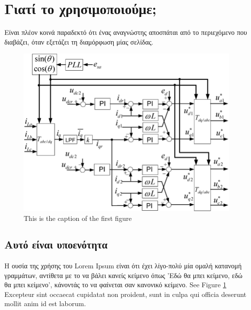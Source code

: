 
\section{Γιατί το χρησιμοποιούμε;}
    \paragraph{}
    Είναι πλέον κοινά παραδεκτό ότι ένας αναγνώστης αποσπάται από το περιεχόμενο που διαβάζει, όταν εξετάζει τη διαμόρφωση
    μίας σελίδας.

    \begin{figure}[h!]
        \centering
        \includegraphics[scale=0.3]{assets/figures/figure_1.png}
        \caption{This is the caption of the first figure}
        \label{fig:figure of something}
    \end{figure}
    
    \subsection{Αυτό είναι υποενότητα}
    \paragraph{}
    Η ουσία της χρήσης του Lorem Ipsum είναι ότι έχει λίγο-πολύ μία ομαλή κατανομή γραμμάτων, αντίθετα με το
    να βάλει κανείς κείμενο όπως 'Εδώ θα μπει κείμενο, εδώ θα μπει κείμενο', κάνοντάς το να φαίνεται σαν κανονικό κείμενο.
    See Figure \ref{fig:figure of something}
    Excepteur sint occaecat cupidatat non proident, sunt in culpa qui officia deserunt mollit anim id est laborum.

